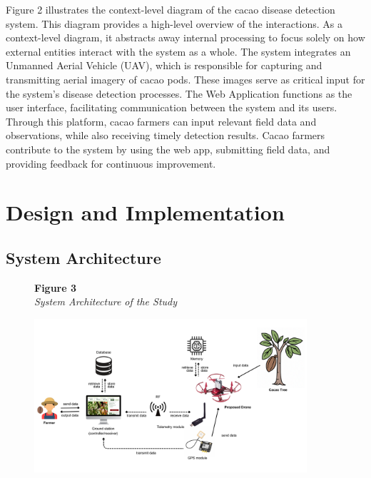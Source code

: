 Figure 2 illustrates the context-level diagram of the cacao disease detection system. This diagram provides a high-level overview of the interactions. As a context-level diagram, it abstracts away internal processing to focus solely on how external entities interact with the system as a whole. The system integrates an Unmanned Aerial Vehicle (UAV), which is responsible for capturing and transmitting aerial imagery of cacao pods. These images serve as critical input for the system’s disease detection processes. The Web Application functions as the user interface, facilitating communication between the system and its users. Through this platform, cacao farmers can input relevant field data and observations, while also receiving timely detection results. Cacao farmers contribute to the system by using the web app, submitting field data, and providing feedback for continuous improvement.


\section{Design and Implementation}
\subsection{System Architecture}

\begin{figure}[H]
	\raggedright
	\textbf{Figure 3} \\ %
	\textit{System Architecture of the Study} %

	\vspace{0.5em}
	\centering
	\includegraphics[width=0.9\textwidth]{figures/SysArch.pdf} %

	\vspace{0.5em}
	\raggedright

	\label{fig:SysArch}
\end{figure}


